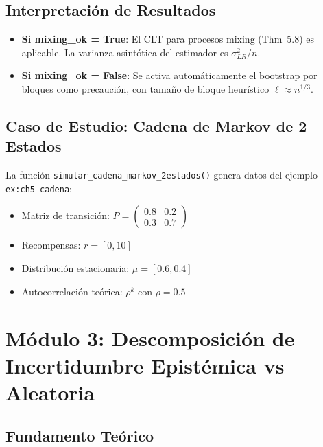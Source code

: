 \documentclass[12pt,a4paper]{article}
\begin{document}
\subsection{Interpretación de Resultados}

\begin{itemize}
	\item \textbf{Si mixing\_ok = True}: El CLT para procesos mixing (Thm~5.8) es aplicable. La varianza asintótica del estimador es $\sigma^2_{LR} / n$.
	\item \textbf{Si mixing\_ok = False}: Se activa automáticamente el bootstrap por bloques como precaución, con tamaño de bloque heurístico $\ell \approx n^{1/3}$.
\end{itemize}

\subsection{Caso de Estudio: Cadena de Markov de 2 Estados}

La función \texttt{simular\_cadena\_markov\_2estados()} genera datos del ejemplo \texttt{ex:ch5-cadena}:

\begin{itemize}
	\item Matriz de transición: $P = \begin{pmatrix} 0.8 & 0.2 \\ 0.3 & 0.7 \end{pmatrix}$
	\item Recompensas: $r = [0, 10]$
	\item Distribución estacionaria: $\mu = [0.6, 0.4]$
	\item Autocorrelación teórica: $\rho^k$ con $\rho = 0.5$
\end{itemize}

\newpage

\section{Módulo 3: Descomposición de Incertidumbre Epistémica vs Aleatoria}

\subsection{Fundamento Teórico}
\end{document}
